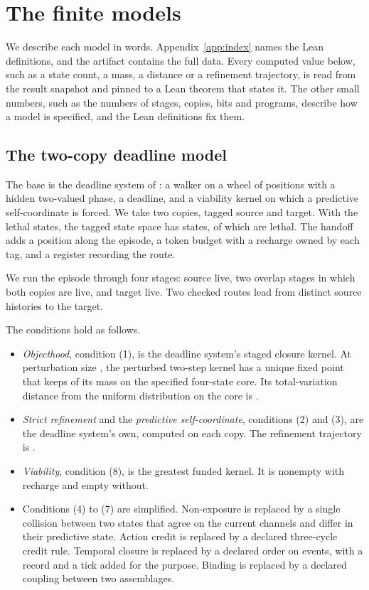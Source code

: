 \section{The finite models}
\label{app:models}

We describe each model in words. Appendix~\ref{app:index} names the Lean
definitions, and the artifact contains the full data. Every computed value
below, such as a state count, a mass, a distance or a refinement trajectory,
is read from the result snapshot and pinned to a Lean theorem that states it.
The other small numbers, such as the numbers of stages, copies, bits and
programs, describe how a model is specified, and the Lean definitions fix
them.

\subsection{The two-copy deadline model}
\label{app:twocopy}

The base is the deadline system of \citet{TsiokosForcing2026}: a walker on a
wheel of positions with a hidden two-valued phase, a deadline, and a viability
kernel on which a predictive self-coordinate is forced. We take
two copies, tagged source and target. With the lethal states, the tagged
state space has \snapPosZeroFourTaggedAmbientStates{} states, of which
\snapPosZeroFourTaggedLethalStates{} are lethal. The handoff adds a position
along the episode, a token budget with a recharge owned by each tag, and a
register recording the route.

We run the episode through four stages: source live, two overlap stages in which
both copies are live, and target live. Two checked routes lead from distinct
source histories to the target.

The conditions hold as follows.
\begin{itemize}
\item \emph{Objecthood}, condition (1), is the deadline system's staged closure
kernel. At perturbation size \snapPosZeroFourCOneEpsilon{}, the perturbed
two-step kernel has a unique fixed point that keeps
\snapPosZeroFourCOneRecurrentMass{} of its mass on the specified four-state
core. Its total-variation distance from the uniform distribution on the core
is \snapPosZeroFourCOneTotalVariation{}.
\item \emph{Strict refinement} and the \emph{predictive self-coordinate},
conditions (2) and (3), are the deadline system's own, computed on each copy.
The refinement trajectory is \snapPosZeroFourCThreeTrajectory{}.
\item \emph{Viability}, condition (8), is the greatest funded kernel. It is
nonempty with recharge and empty without.
\item Conditions (4) to (7) are simplified. Non-exposure is replaced by a
single collision between two states that agree on the current channels and
differ in their predictive state. Action credit is replaced by a declared
three-cycle credit rule. Temporal closure is replaced by a declared order on
events, with a record and a tick added for the purpose. Binding is replaced by
a declared coupling between two assemblages.
\end{itemize}

